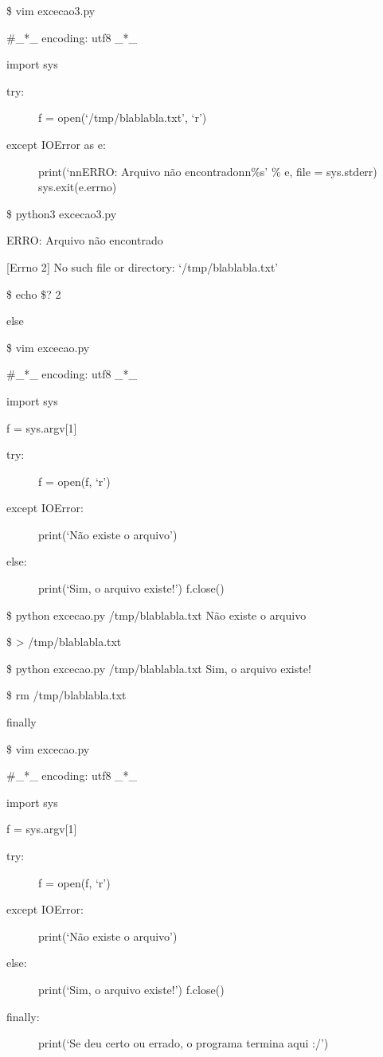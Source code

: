\documentclass[letterpaper,10pt,brazil]{sphinxmanual}
\begin{document}
\$ vim excecao3.py

\#\_*\_ encoding: utf\sphinxhyphen{}8 \_*\_

import sys
\begin{description}
\item[{try:}] \leavevmode
f = open(‘/tmp/blablabla.txt’, ‘r’)

\item[{except IOError as e:}] \leavevmode
print(‘nnERRO: Arquivo não encontradonn\%s’ \% e, file = sys.stderr)
sys.exit(e.errno)

\end{description}

\$ python3 excecao3.py

ERRO: Arquivo não encontrado

{[}Errno 2{]} No such file or directory: ‘/tmp/blablabla.txt’

\$ echo \$?
2

else

\$ vim excecao.py

\#\_*\_ encoding: utf\sphinxhyphen{}8 \_*\_

import sys

f = sys.argv{[}1{]}
\begin{description}
\item[{try:}] \leavevmode
f = open(f, ‘r’)

\item[{except IOError:}] \leavevmode
print(‘Não existe o arquivo’)

\item[{else:}] \leavevmode
print(‘Sim, o arquivo existe!’)
f.close()

\end{description}

\$ python excecao.py /tmp/blablabla.txt
Não existe o arquivo

\$ \textgreater{} /tmp/blablabla.txt

\$ python excecao.py /tmp/blablabla.txt
Sim, o arquivo existe!

\$ rm /tmp/blablabla.txt

finally

\$ vim excecao.py

\#\_*\_ encoding: utf\sphinxhyphen{}8 \_*\_

import sys

f = sys.argv{[}1{]}
\begin{description}
\item[{try:}] \leavevmode
f = open(f, ‘r’)

\item[{except IOError:}] \leavevmode
print(‘Não existe o arquivo’)

\item[{else:}] \leavevmode
print(‘Sim, o arquivo existe!’)
f.close()

\item[{finally:}] \leavevmode
print(‘Se deu certo ou errado, o programa termina aqui :/’)

\end{description}
\end{document}
